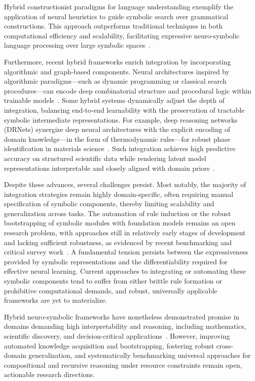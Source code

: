 \documentclass[sigconf]{acmart}
\begin{document}
Hybrid constructionist paradigms for language understanding exemplify the application of neural heuristics to guide symbolic search over grammatical constructions. This approach outperforms traditional techniques in both computational efficiency and scalability, facilitating expressive neuro-symbolic language processing over large symbolic spaces~\cite{ref54}.

Furthermore, recent hybrid frameworks enrich integration by incorporating algorithmic and graph-based components. Neural architectures inspired by algorithmic paradigms—such as dynamic programming or classical search procedures—can encode deep combinatorial structure and procedural logic within trainable models~\cite{ref5,ref56,ref86}. Some hybrid systems dynamically adjust the depth of integration, balancing end-to-end learnability with the preservation of tractable symbolic intermediate representations. For example, deep reasoning networks (DRNets) synergize deep neural architectures with the explicit encoding of domain knowledge—in the form of thermodynamic rules—for robust phase identification in materials science~\cite{ref45}. Such integration achieves high predictive accuracy on structured scientific data while rendering latent model representations interpretable and closely aligned with domain priors~\cite{ref45,ref93}.

Despite these advances, several challenges persist. Most notably, the majority of integration strategies remain highly domain-specific, often requiring manual specification of symbolic components, thereby limiting scalability and generalization across tasks. The automation of rule induction or the robust bootstrapping of symbolic modules with foundation models remains an open research problem, with approaches still in relatively early stages of development and lacking sufficient robustness, as evidenced by recent benchmarking and critical survey work~\cite{ref1,ref22,ref45,ref49,ref54,ref68}. A fundamental tension persists between the expressiveness provided by symbolic representations and the differentiability required for effective neural learning. Current approaches to integrating or automating these symbolic components tend to suffer from either brittle rule formation or prohibitive computational demands, and robust, universally applicable frameworks are yet to materialize.

Hybrid neuro-symbolic frameworks have nonetheless demonstrated promise in domains demanding high interpretability and reasoning, including mathematics, scientific discovery, and decision-critical applications~\cite{ref1,ref5,ref10,ref11,ref42,ref45,ref49,ref54,ref68,ref86}. However, improving automated knowledge acquisition and bootstrapping, fostering robust cross-domain generalization, and systematically benchmarking universal approaches for compositional and recursive reasoning under resource constraints remain open, actionable research directions.
\end{document}
